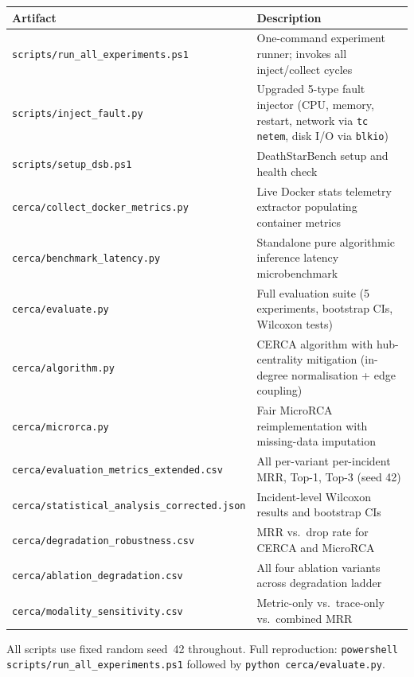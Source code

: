 \documentclass[11pt,a4paper]{article}
\newcommand{\tb}[1]{\textbf{#1}}
\begin{document}
\begin{center}\small
\begin{tabular}{|L{5.6cm}|L{8.0cm}|}
\hline
\tb{Artifact} & \tb{Description} \\ \hline
\texttt{scripts/run\_all\_experiments.ps1} & One-command experiment runner; invokes all inject/collect cycles \\ \hline
\texttt{scripts/inject\_fault.py} & Upgraded 5-type fault injector (CPU, memory, restart, network via \texttt{tc netem}, disk I/O via \texttt{blkio}) \\ \hline
\texttt{scripts/setup\_dsb.ps1} & DeathStarBench setup and health check \\ \hline
\texttt{cerca/collect\_docker\_metrics.py} & Live Docker stats telemetry extractor populating container metrics \\ \hline
\texttt{cerca/benchmark\_latency.py} & Standalone pure algorithmic inference latency microbenchmark \\ \hline
\texttt{cerca/evaluate.py} & Full evaluation suite (5 experiments, bootstrap CIs, Wilcoxon tests) \\ \hline
\texttt{cerca/algorithm.py} & CERCA algorithm with hub-centrality mitigation (in-degree normalisation + edge coupling) \\ \hline
\texttt{cerca/microrca.py} & Fair MicroRCA reimplementation with missing-data imputation \\ \hline
\texttt{cerca/evaluation\_metrics\_extended.csv} & All per-variant per-incident MRR, Top-1, Top-3 (seed 42) \\ \hline
\texttt{cerca/statistical\_analysis\_corrected.json} & Incident-level Wilcoxon results and bootstrap CIs \\ \hline
\texttt{cerca/degradation\_robustness.csv} & MRR vs.\ drop rate for CERCA and MicroRCA \\ \hline
\texttt{cerca/ablation\_degradation.csv} & All four ablation variants across degradation ladder \\ \hline
\texttt{cerca/modality\_sensitivity.csv} & Metric-only vs.\ trace-only vs.\ combined MRR \\ \hline
\end{tabular}
\end{center}

All scripts use fixed random seed~42 throughout. Full reproduction: \texttt{powershell scripts/run\_all\_experiments.ps1} followed by \texttt{python cerca/evaluate.py}.

\end{document}
